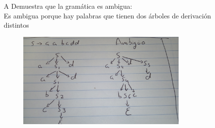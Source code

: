 \documentclass{article}
\begin{document}
\begin{itemize}
  \item [A] Demuestra que la gramática es ambigua:\\
        Es ambigua porque hay palabras que tienen dos árboles de derivación distintos

        \begin{figure}[H]
          \centering
          \includegraphics[width=0.8\textwidth]{fotos/derivacion1}
        \end{figure}


\end{itemize}
\end{document}
